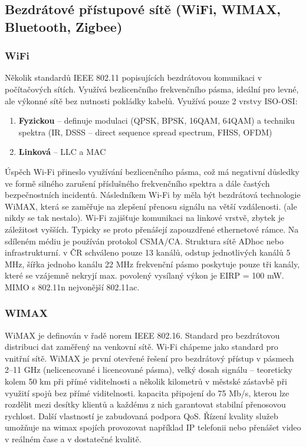 \subsection{Bezdrátové přístupové sítě (WiFi, WIMAX, Bluetooth, Zigbee)}
\subsubsection{WiFi}
Několik standardů IEEE 802.11 popisujících bezdrátovou komunikaci v počítačových sítích. Využívá bezlicenčního frekvenčního pásma, ideální pro levné, ale výkonné sítě bez nutnosti pokládky kabelů. Využívá pouze 2 vrstvy ISO-OSI:
\begin{enumerate}
\item \textbf{Fyzickou} -- definuje modulaci (QPSK, BPSK, 16QAM, 64QAM) a techniku spektra (IR, DSSS -- direct sequence spread spectrum, FHSS, OFDM)
\item \textbf{Linková} -- LLC a MAC
\end{enumerate}

Úspěch Wi-Fi přineslo využívání bezlicenčního pásma, což má negativní důsledky ve formě silného zarušení příslušného frekvenčního spektra a dále častých bezpečnostních incidentů. Následníkem Wi-Fi by měla být bezdrátová technologie WiMAX, která se zaměřuje na zlepšení přenosu signálu na větší vzdálenosti. (ale nikdy se tak nestalo).
Wi-Fi zajišťuje komunikaci na linkové vrstvě, zbytek je záležitost vyšších. Typicky se proto přenášejí zapouzdřené ethernetové rámce. Na sdíleném médiu je používán protokol 
CSMA/CA. Struktura sítě ADhoc nebo infrastrukturní. v ČR schváleno pouze 13 kanálů, odstup jednotlivých kanálů 5 MHz, šířka jednoho kanálu 22 MHz 
frekvenční pásmo poskytuje pouze tři kanály, které se vzájemně nekryjí max. povolený vysílaný výkon je EIRP = 100 mW.  MIMO s 802.11n nejvonější 802.11ac.


\subsubsection{WIMAX}
WiMAX je definován v řadě norem IEEE 802.16. Standard pro bezdrátovou distribuci dat zaměřený na venkovní sítě. Wi-Fi chápeme jako standard pro vnitřní sítě.
WiMAX je první otevřené řešení pro bezdrátový přístup v pásmech 2–11 GHz (nelicencované i licencované pásma), velký dosah signálu – teoreticky kolem 50 km při přímé viditelnosti a několik kilometrů v městské zástavbě při využití spojů bez přímé viditelnosti. kapacita připojení do 75 Mb/s, kterou lze rozdělit mezi desítky klientů a každému z nich garantovat stabilní přenosovou rychlost. Další vlastností je zabudovaná podpora QoS. Řízení kvality služeb umožňuje na wimax spojích provozovat například IP telefonii nebo přenášet video v reálném čase a v dostatečné kvalitě.

